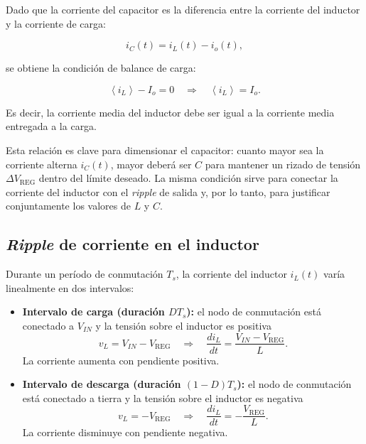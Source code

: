\documentclass[a4paper,12pt]{article}
\begin{document}
Dado que la corriente del capacitor es la diferencia entre la corriente del inductor y la corriente de carga:

\begin{equation}
    i_C(t) = i_L(t) - i_o(t),
\end{equation}

se obtiene la condición de balance de carga:

\begin{equation}
    \left< i_L \right> - I_o = 0 \quad \Rightarrow \quad \boxed{\left< i_L \right> = I_o}.
\end{equation}

Es decir, la corriente media del inductor debe ser igual a la corriente media entregada a la carga.

Esta relación es clave para dimensionar el capacitor: cuanto mayor sea la corriente alterna $i_C(t)$, mayor deberá ser $C$ para mantener un rizado de tensión $\Delta V_\text{REG}$ dentro del límite deseado. La misma condición sirve para conectar la corriente del inductor con el \textit{ripple} de salida y, por lo tanto, para justificar conjuntamente los valores de $L$ y $C$.

\subsection{\textit{Ripple} de corriente en el inductor}

Durante un período de conmutación $T_s$, la corriente del inductor $i_L(t)$ varía linealmente en dos intervalos:

\begin{itemize}
    \item \textbf{Intervalo de carga (duración $D T_s$):} el nodo de conmutación está conectado a $V_{IN}$ y la tensión sobre el inductor es positiva
    \begin{equation}
        v_L = V_{IN} - V_\text{REG} \quad \Rightarrow \quad \frac{di_L}{dt} = \frac{V_{IN} - V_\text{REG}}{L}.
    \end{equation}
    La corriente aumenta con pendiente positiva.
    
    \item \textbf{Intervalo de descarga (duración $(1-D) T_s$):} el nodo de conmutación está conectado a tierra y la tensión sobre el inductor es negativa
    \begin{equation}
        v_L = -V_\text{REG} \quad \Rightarrow \quad \frac{di_L}{dt} = -\frac{V_\text{REG}}{L}.
    \end{equation}
    La corriente disminuye con pendiente negativa.
\end{itemize}
\end{document}
